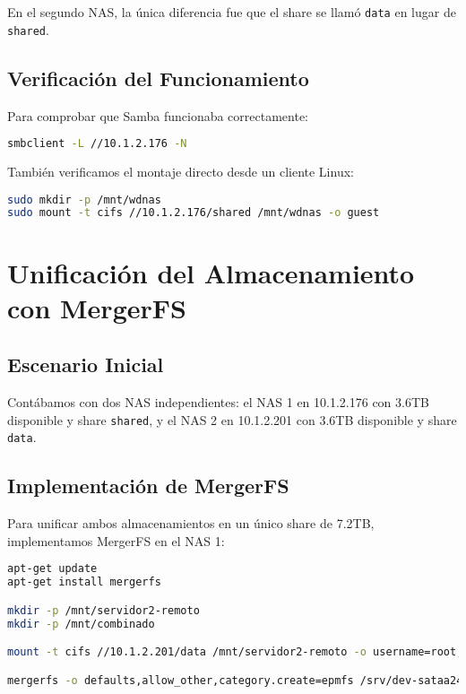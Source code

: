 \documentclass[12pt, a4paper]{article}
\begin{document}
En el segundo NAS, la única diferencia fue que el share se llamó \texttt{data} en lugar de \texttt{shared}.

\subsection{Verificación del Funcionamiento}
Para comprobar que Samba funcionaba correctamente: \\

\begin{lstlisting}[language=bash, caption=Verificación de acceso Samba.]
smbclient -L //10.1.2.176 -N
\end{lstlisting}

También verificamos el montaje directo desde un cliente Linux: \\

\begin{lstlisting}[language=bash, caption=Montaje manual desde cliente.]
sudo mkdir -p /mnt/wdnas
sudo mount -t cifs //10.1.2.176/shared /mnt/wdnas -o guest
\end{lstlisting}

\section{Unificación del Almacenamiento con MergerFS}

\subsection{Escenario Inicial}
Contábamos con dos NAS independientes: el NAS 1 en 10.1.2.176 con 3.6TB disponible y share \texttt{shared}, y el NAS 2 en 10.1.2.201 con 3.6TB disponible y share \texttt{data}.

\subsection{Implementación de MergerFS}
Para unificar ambos almacenamientos en un único share de 7.2TB, implementamos MergerFS en el NAS 1: \\

\begin{lstlisting}[language=bash, caption=Configuración de MergerFS en NAS 1.]
apt-get update
apt-get install mergerfs

mkdir -p /mnt/servidor2-remoto
mkdir -p /mnt/combinado

mount -t cifs //10.1.2.201/data /mnt/servidor2-remoto -o username=root,password=root,vers=3.0

mergerfs -o defaults,allow_other,category.create=epmfs /srv/dev-sataa24:/mnt/servidor2-remoto /mnt/combinado
\end{lstlisting}
\end{document}
